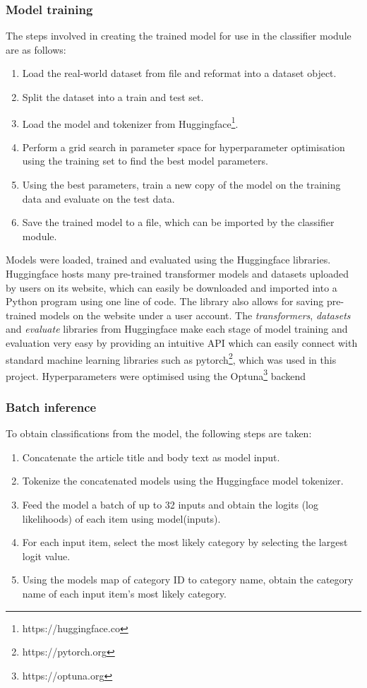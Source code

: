 \documentclass{l4proj}
\begin{document}
\subsubsection{Model training} \hfill \par
    The steps involved in creating the trained model for use in the classifier module are as follows:
    \begin{enumerate}
        \item Load the real-world dataset from file and reformat into a dataset object.
        \item Split the dataset into a train and test set.
        \item Load the model and tokenizer from Huggingface\footnote{https://huggingface.co}.
        \item Perform a grid search in parameter space for hyperparameter optimisation using the training set to find the best model parameters.
        \item Using the best parameters, train a new copy of the model on the training data and evaluate on the test data.
        \item Save the trained model to a file, which can be imported by the classifier module.
    \end{enumerate}
    Models were loaded, trained and evaluated using the Huggingface libraries. Huggingface hosts many pre-trained transformer models and datasets uploaded by users on its website, which can easily be downloaded and imported into a Python program using one line of code. The library also allows for saving pre-trained models on the website under a user account. The \emph{transformers}, \emph{datasets} and \emph{evaluate} libraries from Huggingface make each stage of model training and evaluation very easy by providing an intuitive API which can easily connect with standard machine learning libraries such as pytorch\footnote{https://pytorch.org}, which was used in this project. Hyperparameters were optimised using the Optuna\footnote{https://optuna.org} backend\par
    
\subsubsection{Batch inference} \hfill \par
    To obtain classifications from the model, the following steps are taken:
    \begin{enumerate}
        \item Concatenate the article title and body text as model input.
        \item Tokenize the concatenated models using the Huggingface model tokenizer.
        \item Feed the model a batch of up to 32 inputs and obtain the logits (log likelihoods) of each item using model(inputs).
        \item For each input item, select the most likely category by selecting the largest logit value.
        \item Using the models map of category ID to category name, obtain the category name of each input item's most likely category.
    \end{enumerate}
\end{document}
